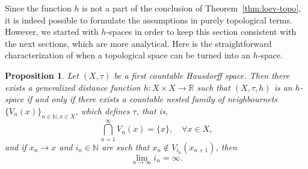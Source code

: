 \documentclass[12pt]{article}
\newtheorem{proposition}[theorem]{Proposition}
\begin{document}
Since the function $h$ is not a part of the conclusion of Theorem~\ref{thm:loev-topo}, it is indeed possible to formulate the assumptions in purely topological terms. However, we started with $h$-spaces in order to keep this section consistent with the next sections, which are more analytical. Here is the straightforward characterization of when a topological space can be turned into an $h$-space.

\begin{proposition}
    \label{pro:char-h-space}
    Let $(X,\tau)$ be a first countable Hausdorff space. Then there exists a generalized distance function $h:X\times X\to \mathbb{R}$ such that $(X,\tau,h)$ 
    is an $h$-space if and only if there exists a countable nested family of neighbournets $\{V_n(x)\}_{n\in\mathbb{N}, x\in X}$, 
    which defines $\tau$, that is,
    \begin{equation}
        \label{eq:V-def-tau}
        \bigcap_{n=1}^\infty V_n(x) = \{x\},\quad\forall x\in X,
    \end{equation}
    and if $x_n\to x$ and $i_n\in\mathbb{N}$ are such that $x_n\notin V_{i_n}(x_{n+1})$, then
    \begin{equation}
        \label{eq:in-to-infty}
        \lim_{n\to\infty} i_n = \infty.
    \end{equation}
\end{proposition}
\end{document}
